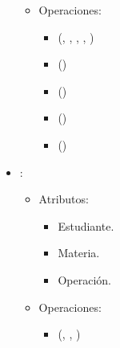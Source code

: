 \documentclass[11pt]{article}
\begin{document}
\begin{itemize}
      \begin{itemize}
         \item Operaciones:
         
         \begin{itemize}
            \item {}(, , , , )
            \item {}()
            \item {}()
            \item {}()
            \item {}()
         \end{itemize}
      \end{itemize}


      \item {}:
      \begin{itemize}
         \item Atributos:

         \begin{itemize}
            \item Estudiante.
            \item Materia.
            \item Operación.
         \end{itemize}
      \end{itemize}

      \begin{itemize}
         \item Operaciones:
         
         \begin{itemize}
            \item {}(, , )
         \end{itemize}
      \end{itemize}
      
   \end{itemize}
\end{document}
